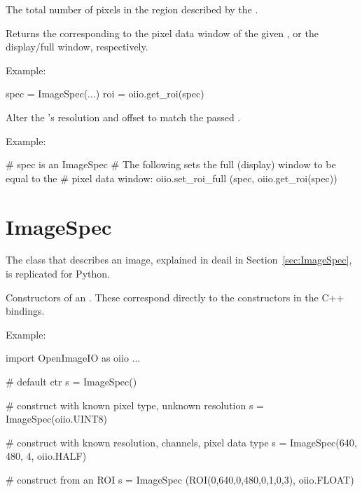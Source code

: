 The total number of pixels in the region described by the \ROI.
\apiend


Returns the \ROI corresponding to the pixel data window of the given
\ImageSpec, or the display/full window, respectively.

\noindent Example:
\begin{code}
    spec = ImageSpec(...)
    roi = oiio.get_roi(spec)
\end{code}
\apiend

Alter the \ImageSpec's resolution and offset to match the passed \ROI.

\noindent Example:
\begin{code}
    # spec is an ImageSpec
    # The following sets the full (display) window to be equal to the
    # pixel data window:
    oiio.set_roi_full (spec, oiio.get_roi(spec))
\end{code}
\apiend


\section{ImageSpec}
\label{sec:pythonimagespec}

The \ImageSpec class that describes an image, explained in deail in
Section~\ref{sec:ImageSpec}, is replicated for Python.

Constructors of an \ImageSpec. These correspond directly to the constructors
in the C++ bindings.

\noindent Example:
\begin{code}
    import OpenImageIO as oiio
    ...

    # default ctr
    s = ImageSpec()

    # construct with known pixel type, unknown resolution
    s = ImageSpec(oiio.UINT8)

    # construct with known resolution, channels, pixel data type
    s = ImageSpec(640, 480, 4, oiio.HALF)

    # construct from an ROI
    s = ImageSpec (ROI(0,640,0,480,0,1,0,3), oiio.FLOAT)
\end{code}
\apiend

